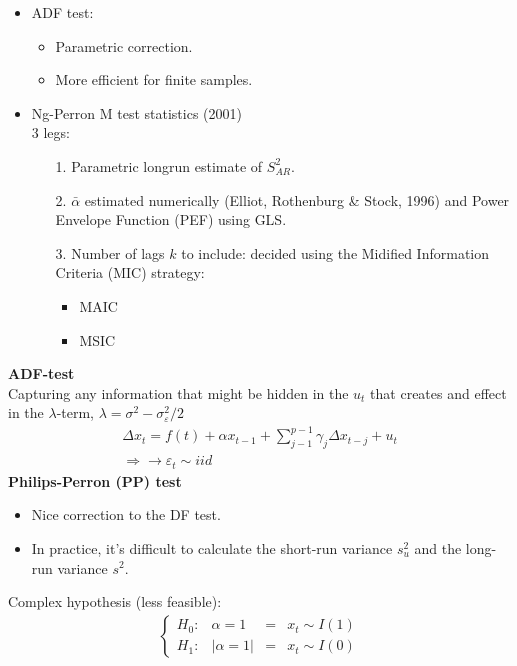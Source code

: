 \begin{multicols}{2}
\begin{itemize}
\begin{itemize}
        \end{itemize}
  \item ADF test:
  \begin{itemize}
    \item Parametric correction.
    \item More efficient for finite samples.
  \end{itemize}
  \item Ng-Perron M test statistics (2001)\\
        3 legs:
\  \begin{itemize}
    \item[1.] Parametric longrun estimate of $S^2_{AR}$.
    \item[2.] $\bar{\alpha}$ estimated numerically (Elliot, Rothenburg \& Stock, 1996) and Power Envelope Function (PEF) using GLS.
    \item[3.] Number of lags $k$ to include: decided using the Midified Information Criteria (MIC) strategy:
    \begin{itemize}
      \item MAIC
      \item MSIC
    \end{itemize}
  \end{itemize}
 \end{itemize}
\textbf{ADF-test}\\
Capturing any information that might be hidden in the $u_t$ that creates and effect in the $\lambda$-term, $\lambda = \sigma^2-\sigma^2_{\varepsilon} / 2$
  \begin{align*}
  \Delta x_t=f(t)+\alpha x_{t-1}+ \sum\limits^{p-1}_{j-1} \gamma_j\Delta x_{t-j} + u_t \\
  \Rightarrow \rightarrow \varepsilon_t\sim iid
  \end{align*}
\textbf{Philips-Perron (PP) test}\\
  \begin{itemize}
  \item Nice correction to the DF test.
  \item In practice, it's difficult to calculate the short-run variance $s_u^2$ and the long-run  variance $s^2$.
  \end{itemize}
Complex hypothesis (less feasible):
  \begin{align*}
    \left\{ \begin{array}{cccc}
      H_0: & \alpha=1     & = & x_t\sim I(1) \\
      H_1: & |\alpha=1|   & = & x_t\sim I(0)
  \end{array} \right.

\end{align*}
\end{multicols}
